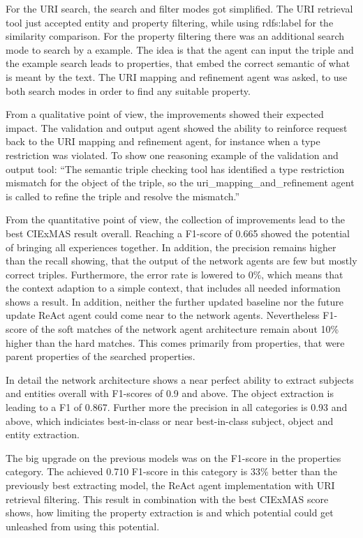 \documentclass[a4paper,oneside,bibliography=totoc]{scrbook}
\begin{document}
For the URI search, the search and filter modes got simplified. The URI retrieval tool just accepted entity and property filtering, while using rdfs:label for the similarity comparison. For the property filtering there was an additional search mode to search by a example. The idea is that the agent can input the triple and the example search leads to properties, that embed the correct semantic of what is meant by the text. The URI mapping and refinement agent was asked, to use both search modes in order to find any suitable property.

From a qualitative point of view, the improvements showed their expected impact. The validation and output agent showed the ability to reinforce request back to the URI mapping and refinement agent, for instance when a type restriction was violated. To show one reasoning example of the validation and output tool: \enquote{The semantic triple checking tool has identified a type restriction mismatch for the object of the triple, so the uri\_mapping\_and\_refinement agent is called to refine the triple and resolve the mismatch.}

From the quantitative point of view, the collection of improvements lead to the best CIExMAS result overall. Reaching a F1-score of 0.665 showed the potential of bringing all experiences together. In addition, the precision remains higher than the recall showing, that the output of the network agents are few but mostly correct triples. Furthermore, the error rate is lowered to 0\%, which means that the context adaption to a simple context, that includes all needed information shows a result. In addition, neither the further updated baseline nor the future update ReAct agent could come near to the network agents. Nevertheless F1-score of the soft matches of the network agent architecture remain about 10\% higher than the hard matches. This comes primarily from properties, that were parent properties of the searched properties.

In detail the network architecture shows a near perfect ability to extract subjects and entities overall with F1-scores of 0.9 and above. The object extraction is leading to a F1 of 0.867. Further more the precision in all categories is 0.93 and above, which indiciates best-in-class or near best-in-class subject, object and entity extraction.

The big upgrade on the previous models was on the F1-score in the properties category. The achieved 0.710 F1-score in this category is 33\% better than the previously best extracting model, the ReAct agent implementation with URI retrieval filtering. This result in combination with the best CIExMAS score shows, how limiting the property extraction is and which potential could get unleashed from using this potential.
\end{document}
